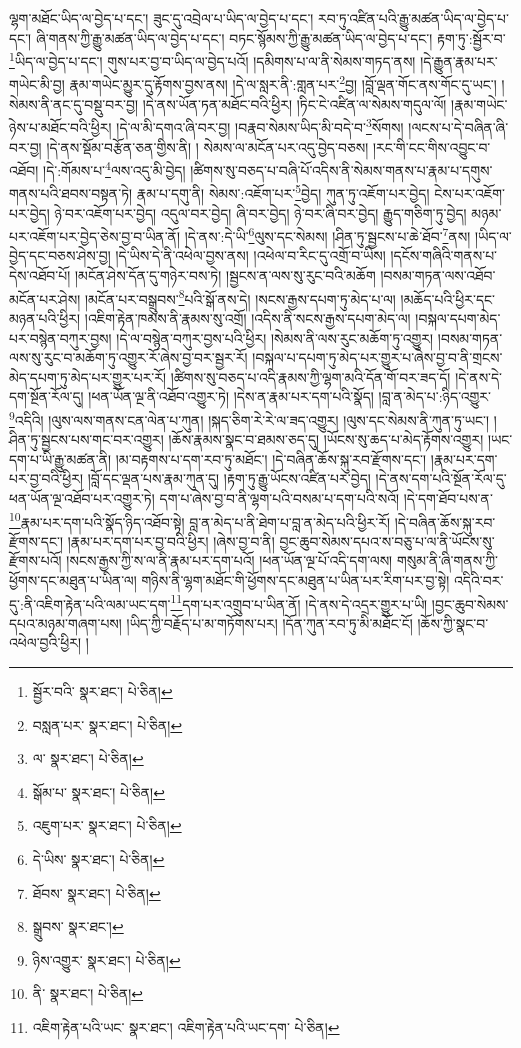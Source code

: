 ལྷག་མཐོང་ཡིད་ལ་བྱེད་པ་དང་། ཟུང་དུ་འབྲེལ་པ་ཡིད་ལ་བྱེད་པ་དང་། རབ་ཏུ་འཛིན་པའི་རྒྱུ་མཚན་ཡིད་ལ་བྱེད་པ་དང་། ཞི་གནས་ཀྱི་རྒྱུ་མཚན་ཡིད་ལ་བྱེད་པ་དང་། བཏང་སྙོམས་ཀྱི་རྒྱུ་མཚན་ཡིད་ལ་བྱེད་པ་དང་། རྟག་ཏུ་:སྦྱོར་བ་\footnote{སྦྱོར་བའི་  སྣར་ཐང་།  པེ་ཅིན། }ཡིད་ལ་བྱེད་པ་དང་། གུས་པར་བྱ་བ་ཡིད་ལ་བྱེད་པའོ། །དམིགས་པ་ལ་ནི་སེམས་གཏད་ནས། །དེ་རྒྱུན་རྣམ་པར་གཡེང་མི་བྱ། རྣམ་གཡེང་མྱུར་དུ་རྟོགས་བྱས་ནས། །དེ་ལ་སླར་ནི་:གླན་པར་\footnote{བསླན་པར་  སྣར་ཐང་།  པེ་ཅིན། }བྱ། །བློ་ལྡན་གོང་ནས་གོང་དུ་ཡང་། །སེམས་ནི་ནང་དུ་བསྡུ་བར་བྱ། །དེ་ནས་ཡོན་ཏན་མཐོང་བའི་ཕྱིར། །ཏིང་ངེ་འཛིན་ལ་སེམས་གདུལ་ལོ། །རྣམ་གཡེང་ཉེས་པ་མཐོང་བའི་ཕྱིར། །དེ་ལ་མི་དགའ་ཞི་བར་བྱ། །བརྣབ་སེམས་ཡིད་མི་བདེ་བ་\footnote{ལ་  སྣར་ཐང་།  པེ་ཅིན། }སོགས། །ལངས་པ་དེ་བཞིན་ཞི་བར་བྱ། །དེ་ནས་སྡོམ་བརྩོན་ཅན་གྱིས་ནི། །
སེམས་ལ་མངོན་པར་འདུ་བྱེད་བཅས། །རང་གི་ངང་གིས་འབྱུང་བ་འཐོབ། །དེ་:གོམས་པ་\footnote{སྒོམ་པ་  སྣར་ཐང་།  པེ་ཅིན། }ལས་འདུ་མི་བྱེད། །ཚིགས་སུ་བཅད་པ་བཞི་པོ་འདིས་ནི་སེམས་གནས་པ་རྣམ་པ་དགུས་གནས་པའི་ཐབས་བསྟན་ཏེ། རྣམ་པ་དགུ་ནི། སེམས་:འཇོག་པར་\footnote{འཇུག་པར་  སྣར་ཐང་།  པེ་ཅིན། }བྱེད། ཀུན་ཏུ་འཇོག་པར་བྱེད། ངེས་པར་འཇོག་པར་བྱེད། ཉེ་བར་འཇོག་པར་བྱེད། འདུལ་བར་བྱེད། ཞི་བར་བྱེད། ཉེ་བར་ཞི་བར་བྱེད། རྒྱུད་གཅིག་ཏུ་བྱེད། མཉམ་པར་འཇོག་པར་བྱེད་ཅེས་བྱ་བ་ཡིན་ནོ། །དེ་ནས་:དེ་ཡི་\footnote{དེ་ཡིས་  སྣར་ཐང་།  པེ་ཅིན། }ལུས་དང་སེམས། །ཤིན་ཏུ་སྦྱངས་པ་ཆེ་ཐོབ་\footnote{ཐོབས་  སྣར་ཐང་།  པེ་ཅིན། }ནས། །ཡིད་ལ་བྱེད་དང་བཅས་ཤེས་བྱ། །དེ་ཡིས་དེ་ནི་འཕེལ་བྱས་ནས། །འཕེལ་བ་རིང་དུ་འགྲོ་བ་ཡིས། །དངོས་གཞིའི་གནས་པ་དེས་འཐོབ་པོ། །མངོན་ཤེས་དོན་དུ་གཉེར་བས་ཏེ། །སྦྱངས་ན་ལས་སུ་རུང་བའི་མཆོག །བསམ་གཏན་ལས་འཐོབ་མངོན་པར་ཤེས། །མངོན་པར་བསྒྲུབས་\footnote{སྒྲུབས་  སྣར་ཐང་། }པའི་སྒོ་ནས་དེ། །སངས་རྒྱས་དཔག་ཏུ་མེད་པ་ལ། །མཆོད་པའི་ཕྱིར་དང་མཉན་པའི་ཕྱིར། །འཇིག་རྟེན་ཁམས་ནི་རྣམས་སུ་འགྲོ། །འདིས་ནི་སངས་རྒྱས་དཔག་མེད་ལ། །བསྐལ་དཔག་མེད་པར་བསྙེན་བཀུར་བྱས། །དེ་ལ་བསྙེན་བཀུར་བྱས་པའི་ཕྱིར། །སེམས་ནི་ལས་རུང་མཆོག་ཏུ་འགྱུར། །བསམ་གཏན་ལས་སུ་རུང་བ་མཆོག་ཏུ་འགྱུར་རོ་ཞེས་བྱ་བར་སྦྱར་རོ། །བསྐལ་པ་དཔག་ཏུ་མེད་པར་གྱུར་པ་ཞེས་བྱ་བ་ནི་གྲངས་མེད་དཔག་ཏུ་མེད་པར་གྱུར་པར་རོ། །ཚིགས་སུ་བཅད་པ་འདི་རྣམས་ཀྱི་ལྷག་མའི་དོན་གོ་བར་ཟད་དོ། །དེ་ནས་དེ་དག་སྔོན་རོལ་དུ། །ཕན་ཡོན་ལྔ་ནི་འཐོབ་འགྱུར་ཏེ། །དེས་ན་རྣམ་པར་དག་པའི་སྣོད། །བླ་ན་མེད་པ་:ཉིད་འགྱུར་\footnote{ཉིས་འགྱུར་  སྣར་ཐང་།  པེ་ཅིན། }འདིའི། །ལུས་ལས་གནས་ངན་ལེན་པ་ཀུན། །སྐད་ཅིག་རེ་རེ་ལ་ཟད་འགྱུར། །ལུས་དང་སེམས་ནི་ཀུན་ཏུ་ཡང་། །ཤིན་ཏུ་སྦྱངས་པས་གང་བར་འགྱུར། །ཆོས་རྣམས་སྣང་བ་ཐམས་ཅད་དུ། །ཡོངས་སུ་ཆད་པ་མེད་རྟོགས་འགྱུར། །ཡང་དག་པ་ཡི་རྒྱུ་མཚན་ནི། །མ་བརྟགས་པ་དག་རབ་ཏུ་མཐོང་། །དེ་བཞིན་ཆོས་སྐུ་རབ་རྫོགས་དང་། །རྣམ་པར་དག་པར་བྱ་བའི་ཕྱིར། །བློ་དང་ལྡན་པས་རྣམ་ཀུན་དུ། །རྟག་ཏུ་རྒྱུ་ཡོངས་འཛིན་པར་བྱེད། །དེ་ནས་དག་པའི་སྔོན་རོལ་དུ་ཕན་ཡོན་ལྔ་འཐོབ་པར་འགྱུར་ཏེ། དག་པ་ཞེས་བྱ་བ་ནི་ལྷག་པའི་བསམ་པ་དག་པའི་སའོ། །དེ་དག་ཐོབ་པས་ན་\footnote{ནི་  སྣར་ཐང་།  པེ་ཅིན། }རྣམ་པར་དག་པའི་སྣོད་ཉིད་འཐོབ་སྟེ། བླ་ན་མེད་པ་ནི་ཐེག་པ་བླ་ན་མེད་པའི་ཕྱིར་རོ། །དེ་བཞིན་ཆོས་སྐུ་རབ་རྫོགས་དང་། །རྣམ་པར་དག་པར་བྱ་བའི་ཕྱིར། །ཞེས་བྱ་བ་ནི། བྱང་ཆུབ་སེམས་དཔའ་ས་བཅུ་པ་ལ་ནི་ཡོངས་སུ་རྫོགས་པའོ། །སངས་རྒྱས་ཀྱི་ས་ལ་ནི་རྣམ་པར་དག་པའོ། །ཕན་ཡོན་ལྔ་པོ་འདི་དག་ལས། གསུམ་ནི་ཞི་གནས་ཀྱི་ཕྱོགས་དང་མཐུན་པ་ཡིན་ལ། གཉིས་ནི་ལྷག་མཐོང་གི་ཕྱོགས་དང་མཐུན་པ་ཡིན་པར་རིག་པར་བྱ་སྟེ། འདིའི་བར་དུ་:ནི་འཇིག་རྟེན་པའི་ལམ་ཡང་དག་\footnote{འཇིག་རྟེན་པའི་ཡང་  སྣར་ཐང་། འཇིག་རྟེན་པའི་ཡང་དག་  པེ་ཅིན། }དག་པར་འགྲུབ་པ་ཡིན་ནོ། །དེ་ནས་དེ་འདྲར་གྱུར་པ་ཡི། །བྱང་ཆུབ་སེམས་དཔའ་མཉམ་གཞག་པས། །ཡིད་ཀྱི་བརྗོད་པ་མ་གཏོགས་པར། །དོན་ཀུན་རབ་ཏུ་མི་མཐོང་ངོ། །ཆོས་ཀྱི་སྣང་བ་འཕེལ་བྱའི་ཕྱིར། །
